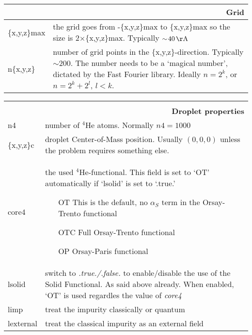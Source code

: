 \documentclass[10pt,a4paper]{article}
\begin{document}
\begin{center}
	\begin{tabular}{l|p{9.6cm}}
		\multicolumn{2}{r}{\textbf{Grid}}	\\
		\hline\hline
		\{x,y,z\}max	&	the grid goes from -\{x,y,z\}max to \{x,y,z\}max so the size is 2$\times$\{{x,y,z}\}max. Typically $\sim\!40\,\mathrm{\AA}$ \\
		\hline
		n\{x,y,z\}		&	number of grid points in the \{x,y,z\}-direction. Typically $\sim\!200$. The number needs to be a `magical number', dictated by the Fast Fourier library. Ideally $n=2^k$, or $n=2^k+2^l$, $l<k$.
	\end{tabular}

	\begin{tabular}{l|p{9.6cm}}
		\multicolumn{2}{r}{\textbf{}}	\\
		\multicolumn{2}{r}{\textbf{Droplet properties}}	\\
		\hline\hline
		n4				&	number of $^4$He atoms. Normally $n4=1000$	\\
		\hline
		\{x,y,z\}c		&	droplet Center-of-Mass position. Usually $(0,0,0)$ unless the problem requires something else.	\\
		\hline
		core4		& the used $^4$He-functional. This field is set to `OT' automatically if `lsolid' is set to `.true.'
		\vspace{5px}
		\begin{enumerate}
			\item[OT] This is the default, no $\alpha_S$ term in the Orsay-Trento functional\footnotemark[1]
			\item[OTC] Full Orsay-Trento functional\footnotemark[1]
			\item[OP] Orsay-Paris functional\footnotemark[2]
		\end{enumerate}		\\
		\hline
		lsolid		& switch to \emph{.true./.false.} to enable/disable the use of the Solid Functional\footnotemark[3]. As said above already. When enabled, `OT' is used regardles the value of \emph{core4} \\
		\hline
		limp		& treat the impurity classically or quantum\\
		\hline
		lexternal	& treat the classical impurity as an external field
	\end{tabular}



\end{center}
\end{document}
